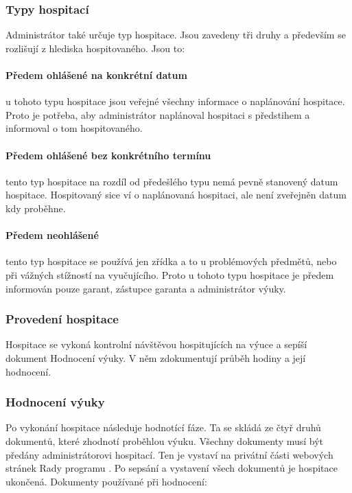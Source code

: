 \subsubsection{Typy hospitací}
Administrátor také určuje typ hospitace. Jsou zavedeny tři druhy a především se rozlišují z hlediska hospitovaného.  Jsou to:

\paragraph*{Předem ohlášené na konkrétní datum} 
u tohoto typu hospitace jsou veřejné všechny informace o naplánování hospitace. Proto je potřeba, aby administrátor naplánoval hospitaci s předstihem a informoval o tom hospitovaného.

\paragraph*{Předem ohlášené bez konkrétního termínu} 
tento typ hospitace na rozdíl od předešlého typu nemá pevně stanovený datum hospitace. Hospitovaný sice ví o naplánovaná hospitaci, ale není zveřejněn datum kdy proběhne.

\paragraph*{Předem neohlášené} 
tento typ hospitace se používá jen zřídka a to u problémových předmětů, nebo při vážných stížností na vyučujícího. Proto u  tohoto typu hospitace je předem informován pouze garant, zástupce garanta a administrátor výuky.

\subsubsection{Provedení hospitace}
Hospitace se vykoná kontrolní návštěvou hospitujících na výuce a sepíší dokument Hodnocení výuky. V něm zdokumentují průběh hodiny a její hodnocení.

\subsubsection{Hodnocení výuky}
Po vykonání hospitace následuje hodnotící fáze. Ta se skládá ze čtyř druhů dokumentů, které zhodnotí proběhlou výuku. Všechny dokumenty musí být předány administrátorovi hospitací. Ten je vystaví na privátní části webových stránek Rady programu \cite{kvalitavyukyweb}. Po sepsání a vystavení všech dokumentů je hospitace ukončená. Dokumenty používané při hodnocení:

